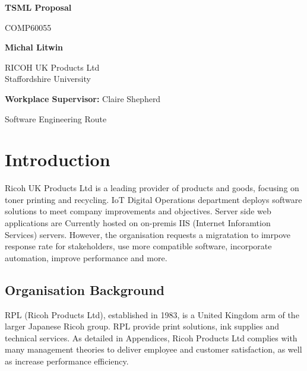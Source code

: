 \documentclass{article}
\begin{document}
\begin{titlepage}
    \begin{center}
        \vspace*{1cm}

        {\Huge\bfseries TSML Proposal \par}
        \vspace{0.5cm}
        {\Large COMP60055\par}

        \vspace{1.5cm}
        {\large\bfseries Michal Litwin \par}
        \large
        RICOH UK Products Ltd\\
        Staffordshire University

        \vfill

        {\large \textbf{Workplace Supervisor:} Claire Shepherd \par}
        \vspace{0.8cm}

        \large Software Engineering Route\\

    \end{center}
\end{titlepage}

\tableofcontents
\pagebreak
\listoftables
\pagebreak
\listoffigures
\pagebreak

\section{Introduction}
Ricoh UK Products Ltd is a leading provider of products and goods, focusing on toner printing and recycling.
IoT Digital Operations department deploys software solutions to meet company improvements and objectives.
Server side web applications are Currently hosted on on-premis IIS (Internet Inforamtion Services) servers.
However, the organisation requests a migratation to imrpove response rate for stakeholders, use more compatible software, incorporate automation, improve performance and more.

\subsection{Organisation Background}
RPL (Ricoh Products Ltd), established in 1983, is a United Kingdom arm of the larger Japanese Ricoh group.
RPL provide print solutions, ink supplies and technical services. 
As detailed in Appendices, Ricoh Products Ltd complies with many management theories to deliver employee and customer satisfaction, as well as increase performance efficiency.
\end{document}
